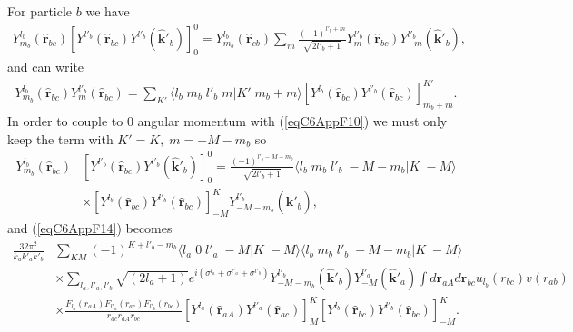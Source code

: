 For  particle $b$ we have
\begin{equation}\label{eqC6AppF15}
\begin{split}
Y^{l_b}_{m_b}(\hat{\mathbf{r}}_{bc})\left[ Y^{l'_b} (\hat{\mathbf r}_{bc}) Y^{l'_b} (\hat{ \mathbf k}'_{b})\right]^0_0=Y^{l_b}_{m_b}(\hat{\mathbf{r}}_{cb})\sum_m \frac{(-1)^{l'_b+m}}{\sqrt{2l'_b+1}}Y^{l'_b}_m (\hat{\mathbf r}_{bc})Y^{l'_b}_{-m} (\hat{ \mathbf k}'_{b}),
\end{split}
\end{equation}
and can write
\begin{equation}\label{eqC6AppG16}
\begin{split}
Y^{l_b}_{m_b}(\hat{\mathbf{r}}_{bc})Y^{l'_b}_m (\hat{\mathbf r}_{bc})=\sum_{K'}\langle l_b\;m_b\;l'_b\;m|K'\;m_b+m\rangle \left[ Y^{l_b} (\hat{\mathbf r}_{bc}) Y^{l'_b} (\hat{\mathbf r}_{bc})\right]^{K'}_{m_b+m}.
\end{split}
\end{equation}
In order to couple to 0 angular momentum with (\ref{eqC6AppF10}) we must only keep the term with  $K'=K,\;m=-M-m_b$ so
\begin{equation}\label{eqC6AppG17}
\begin{split}
Y^{l_b}_{m_b}(\hat{\mathbf{r}}_{bc})&\left[ Y^{l'_b} (\hat{\mathbf r}_{bc}) Y^{l'_b} (\hat{ \mathbf k}'_{b})\right]^0_0=\frac{(-1)^{l'_b-M-m_b}}{\sqrt{2l'_b+1}}\langle l_b\;m_b\;l'_b\;-M-m_b|K\;-M\rangle\\
&\times \left[ Y^{l_b} (\hat{\mathbf r}_{bc}) Y^{l'_b} (\hat{\mathbf r}_{bc})\right]^{K}_{-M}Y^{l'_b}_{-M-m_b} (\hat{ \mathbf k}'_{b}),
\end{split}
\end{equation}
and (\ref{eqC6AppF14}) becomes
\begin{equation}\label{eqC6AppG18}
\begin{split}
\frac{32\pi^2}{k_ak'_ak'_b}&\sum_{KM}(-1)^{K+l'_b-m_b}\langle l_a\;0\;l'_a\;-M|K\;-M\rangle\langle l_b\;m_b\;l'_b\;-M-m_b|K\;-M\rangle\\
&\times \sum_{l_a,l'_a,l'_b}\sqrt{(2l_a+1)} e^{i(\sigma^{l_a}+\sigma^{l'_a}+\sigma^{l'_b})}Y^{l'_b}_{-M-m_b} (\hat{ \mathbf k}'_{b}) Y^{l'_a}_{-M} (\hat{ \mathbf k}'_{a})\int d\mathbf{r}_{aA	}d \mathbf{r}_{bc}u_{l_b}(r_{bc})v(r_{ab}) \\
&\times\frac{F_{l_a}(r_{aA})  F_{l'_a}(r_{ac})F_{l'_b}(r_{bc})}{r_{ac}r_{aA}r_{bc}}\left[ Y^{l_a} (\hat{\mathbf r}_{aA}) Y^{l'_a} (\hat{ \mathbf r}_{ac})\right]^K_M   \left[ Y^{l_b} (\hat{\mathbf r}_{bc}) Y^{l'_b} (\hat{\mathbf r}_{bc})\right]^{K}_{-M}.
\end{split}
\end{equation}

